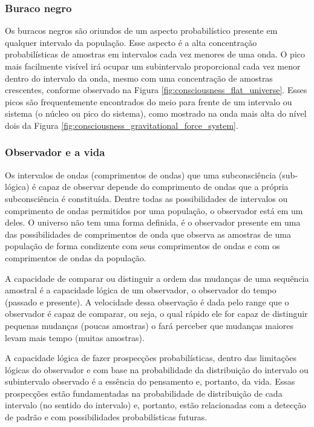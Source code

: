 \subsubsection{Buraco negro}
Os buracos negros são oriundos de um aspecto probabilístico presente em qualquer intervalo da população. Esse aspecto é a alta concentração probabilísticas de amostras em intervalos cada vez menores de uma onda. O pico mais facilmente visível irá ocupar um subintervalo proporcional cada vez menor dentro do intervalo da onda, mesmo com uma concentração de amostras crescentes, conforme observado na Figura \ref{fig:consciousness_flat_universe}. Esses picos são frequentemente encontrados do meio para frente de um intervalo ou sistema (o núcleo ou pico do sistema), como mostrado na onda mais alta do nível dois da Figura \ref{fig:consciousness_gravitational_force_system}.

\subsubsection{Observador e a vida}
Os intervalos de ondas (comprimentos de ondas) que uma subconsciência (sub-lógica) é capaz de observar depende do comprimento de ondas que a própria subconsciência é constituída. Dentre todas as possibilidades de intervalos ou comprimento de ondas permitidos por uma população, o observador está em um deles. O universo não tem uma forma definida, é o observador presente em uma das possibilidades de comprimentos de onda que observa as amostras de uma população de forma condizente com seus comprimentos de ondas e com os comprimentos de ondas da população.

A capacidade de comparar ou distinguir a ordem das mudanças de uma sequência amostral é a capacidade lógica de um observador, o observador do tempo (passado e presente). A velocidade dessa observação é dada pelo range que o observador é capaz de comparar, ou seja, o qual rápido ele for capaz de distinguir pequenas mudanças (poucas amostras) o fará perceber que mudanças maiores levam mais tempo (muitas amostras). 

A capacidade lógica de fazer prospecções probabilísticas, dentro das limitações lógicas do observador e com base na probabilidade da distribuição do intervalo ou subintervalo observado é a essência do pensamento e, portanto, da vida. Essas prospecções estão fundamentadas na probabilidade de distribuição de cada intervalo (no sentido do intervalo) e, portanto, estão relacionadas com a detecção de padrão e com possibilidades probabilísticas futuras.

